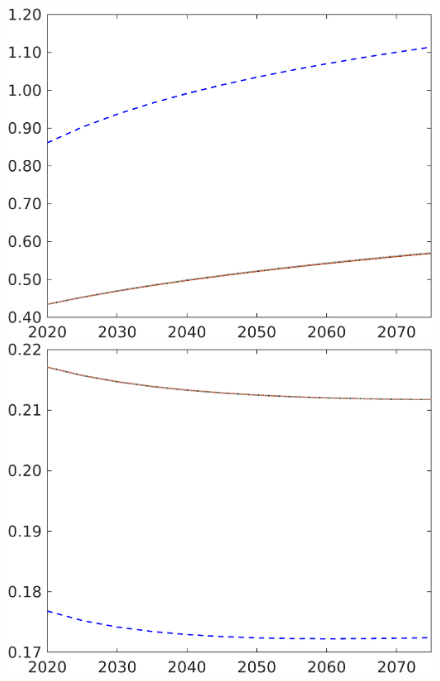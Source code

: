 \begin{figure}[h!!]
\begin{minipage}[]{0.32\textwidth}
\end{minipage}
\begin{minipage}[]{0.32\textwidth}
\includegraphics[width=1\textwidth]{../../codding_model/own_basedOnFried/optimalPol_010922_revision/figures/all_5Sept22/CompRed_TaulCalib_GFF_spillover0_nsk0_xgr0_sep1_LFlimit0_emsbase0_countec0_GovRev0_etaa0.79_lgd0.png}
\end{minipage}
\begin{minipage}[]{0.32\textwidth}
\includegraphics[width=1\textwidth]{../../codding_model/own_basedOnFried/optimalPol_010922_revision/figures/all_5Sept22/CompRed_TaulCalib_pee_spillover0_nsk0_xgr0_sep1_LFlimit0_emsbase0_countec0_GovRev0_etaa0.79_lgd0.png}

\end{minipage}
\end{figure}

